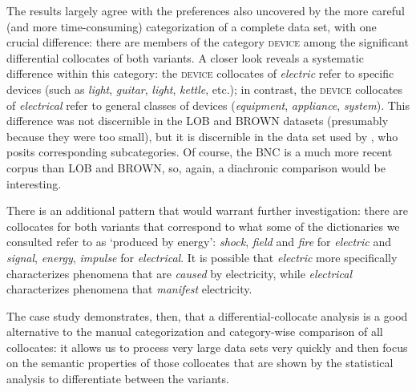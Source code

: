 The results largely agree with the preferences also uncovered by the more careful (and more time\hyp{}consuming) categorization  of a complete data set, with one crucial difference: there are members of the category \textsc{device} among the significant differential collocates  of both variants. A closer look reveals a systematic difference within this category: the \textsc{device} collocates of \textit{electric} refer to specific devices (such as \textit{light}, \textit{guitar}, \textit{light}, \textit{kettle}, etc.); in contrast, the \textsc{device} collocates  of \textit{electrical} refer to general classes of devices (\textit{equipment}, \textit{appliance}, \textit{system}). This difference was not discernible in the LOB  and BROWN  datasets (presumably because they were too small), but it is discernible in the data set used by \citet{kaunisto_electric/electrical_1999}, who posits corresponding subcategories. Of course, the BNC  is a much more recent corpus than LOB  and BROWN,  so, again, a diachronic  comparison would be interesting.

There is an additional pattern that would warrant further investigation: there are collocates  for both variants that correspond to what some of the dictionaries  we consulted refer to as `produced by energy': \textit{shock}, \textit{field} and \textit{fire} for \textit{electric} and \textit{signal}, \textit{energy}, \textit{impulse} for \textit{electrical}. It is possible that \textit{electric} more specifically characterizes phenomena that are \textit{caused} by electricity, while \textit{electrical} characterizes phenomena that \textit{manifest} electricity.

The case study demonstrates, then, that a differential\hyp{}collocate  analysis is a good alternative to the manual  categorization  and category\hyp{}wise comparison of all collocates: it allows us to process very large  data sets very quickly and then focus on the semantic  properties of those collocates that are shown by the statistical analysis to differentiate between the variants.


